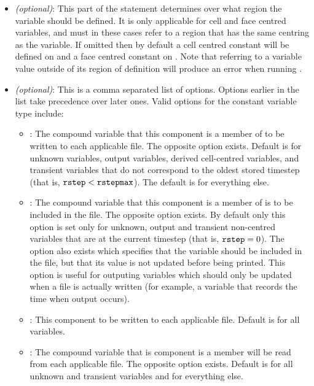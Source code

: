 \begin{itemize}
\item {} \emph{(optional)}:  This part of the statement determines over what region the variable should be defined.  It is only applicable for cell and face centred variables, and must in these cases refer to a region that has the same centring as the variable.  If omitted then by default a cell centred constant will be defined on  and a face centred constant on .  Note that referring to a variable value outside of its region of definition will produce an error when running .
\item {} \emph{(optional)}:  This is a comma separated list of options.  Options earlier in the list take precedence over later ones.  Valid options for the constant variable type include:
%
\begin{itemize}
%
\item {}:  The compound variable that this component is a member of to be written to each applicable  file.  The opposite option  exists.  Default is  for unknown variables, output variables, derived cell-centred variables, and transient variables that do not correspond to the oldest stored timestep (that is, $\texttt{rstep}<\texttt{rstepmax}$).  The default is  for everything else.
%
\item {}:  The compound variable that this component is a member of is to be included in the  file.  The opposite option  exists.  By default only this option is set only for unknown, output and transient non-centred variables that are at the current timestep (that is, $\texttt{rstep}=0$).  The option  also exists which specifies that the variable should be included in the  file, but that its value is not updated before being printed.  This option is useful for outputing variables which should only be updated when a  file is actually written (for example, a variable that records the time when output occurs).
%
\item {}:  This component to be written to each applicable  file.  Default is  for all variables.
%
\item {}:  The compound variable that is component is a member will be read from each applicable  file.  The opposite option  exists.  Default is  for all unknown and transient variables and  for everything else.

\end{itemize}
\end{itemize}
